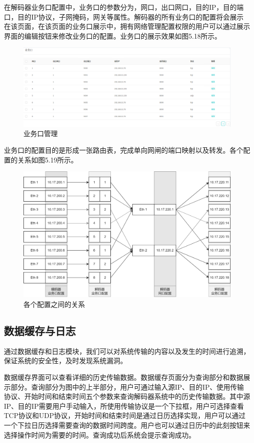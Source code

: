 在解码器业务口配置中，业务口的参数分为，网口，出口网口，目的IP，目的端口，目的IP协议，子网掩码，网关等属性。解码器的所有业务口的配置将会展示在该页面，在该页面的业务口展示中，拥有网络管理配置权限的用户可以通过展示界面的编辑按钮来修改业务口的配置。业务口的展示效果如图5.18所示。

\begin{figure}[!htbp]
\centering
\includegraphics[scale=0.6]{figures/HW/N11.png}
\caption{业务口管理}
\end{figure}

业务口的配置目的是形成一张路由表，完成单向网闸的端口映射以及转发。各个配置的关系如图5.19所示。

\begin{figure}[!htbp]
\centering
\includegraphics[scale=0.4]{figures/HW/N12.png}
\caption{各个配置之间的关系}
\end{figure}

\subsection{数据缓存与日志}

通过数据缓存和日志模块，我们可以对系统传输的内容以及发生的时间进行追溯，保证系统的安全性，及时发现系统漏洞。

数据缓存界面可以查看详细的历史传输数据。数据缓存页面分为查询部分和数据展示部分。查询部分为图中的上半部分，用户可通过输入源IP、目的IP、使用传输协议、开始时间和结束时间五个参数来查询解码器系统中的历史传输数据。其中源IP、目的IP需要用户手动输入，所使用传输协议是一个下拉框，用户可选择查看TCP协议和UDP协议，开始时间和结束时间是通过日历选择实现，用户可以通过一个下拉日历选择需要查询的数据时间跨度。用户也可以通过日历中的此刻按钮来选择操作时间为需要的时间。查询成功后系统会提示查询成功。

